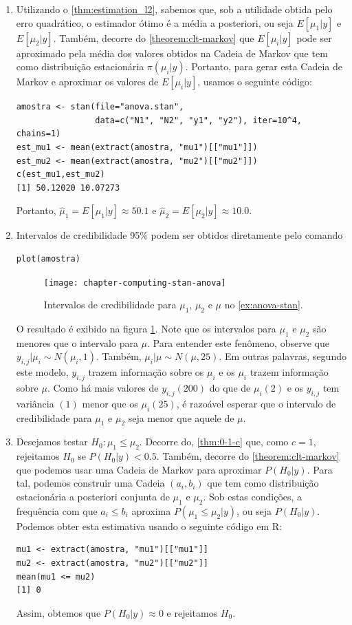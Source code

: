 {\begin{enumerate}[label=(\alph*)]
	\item Utilizando o \cref{thm:estimation_l2},
        sabemos que, sob a utilidade obtida pelo erro quadrático,
				o estimador ótimo é a média a posteriori, 
				ou seja $E[\mu_{1}|y]$ e $E[\mu_{2}|y]$.
				Também, decorre do \cref{theorem:clt-markov} que
				$E[\mu_{i}|y]$ pode ser aproximado pela média
				dos valores obtidos na Cadeia de Markov que
				tem como distribuição estacionária $\pi(\mu_{i}|y)$.
				Portanto, para gerar esta Cadeia de Markov e
				aproximar os valores de $E[\mu_{i}|y]$,
				usamos o seguinte código:
	\begin{verbatim}
amostra <- stan(file="anova.stan", 
                data=c("N1", "N2", "y1", "y2"), iter=10^4, chains=1)	
est_mu1 <- mean(extract(amostra, "mu1")[["mu1"]])
est_mu2 <- mean(extract(amostra, "mu2")[["mu2"]])
c(est_mu1,est_mu2)
[1] 50.12020 10.07273
	\end{verbatim}
  Portanto, $\hat{\mu}_{1} = E[\mu_{1}|y] \approx 50.1$ e 
	$\hat{\mu}_{2} = E[\mu_{2}|y] \approx 10.0$.
	\item Intervalos de credibilidade 95\% podem ser obtidos diretamente pelo comando
	\begin{verbatim}
plot(amostra)
	\end{verbatim}
  \begin{figure}
	 \centering
   \texttt{[image: chapter-computing-stan-anova]}
	 \caption{Intervalos de credibilidade para $\mu_1$, $\mu_2$ e $\mu$
	          no \cref{ex:anova-stan}.}
	 \label{fig:anova-stan}
	\end{figure}
	O resultado é exibido na figura \ref{fig:anova-stan}.
	Note que os intervalos para $\mu_{1}$ e $\mu_{2}$ são menores
	que o intervalo para $\mu$.
	Para entender este fenômeno, observe que $y_{i,j}|\mu_{i} \sim N(\mu_{i},1)$.
	Também, $\mu_{i}|\mu \sim N(\mu,25)$.
	Em outras palavras, segundo este modelo,
	$y_{i,j}$ trazem informação sobre os $\mu_{i}$ e
	os $\mu_{i}$ trazem informação sobre $\mu$.
	Como há mais valores de $y_{i,j} (200)$ do que de $\mu_{i} (2)$
	e os $y_{i,j}$ tem variância $(1)$ menor que os $\mu_{i} (25)$,
	é razoável esperar que o intervalo de credibilidade para $\mu_{1}$ e $\mu_{2}$
	seja menor que aquele de $\mu$.
	
	\item Desejamos testar $H_{0}: \mu_{1} \leq \mu_{2}$.
	      Decorre do, \cref{thm:0-1-c} que, como $c=1$,
				rejeitamos $H_{0}$ se $P(H_{0}|y) < 0.5$.
				Também, decorre do \cref{theorem:clt-markov} que
				podemos usar uma Cadeia de Markov para aproximar $P(H_{0}|y)$.
				Para tal, podemos construir uma Cadeia $(a_{i},b_{i})$ que 
				tem como distribuição estacionária a 
				posteriori conjunta de $\mu_{1}$ e $\mu_{2}$.
				Sob estas condições, a frequência com que $a_{i} \leq b_{i}$
				aproxima $P(\mu_{1} \leq \mu_{2}|y)$, ou seja $P(H_{0}|y)$.
				Podemos obter esta estimativa usando o seguinte código em R:
\begin{verbatim}
mu1 <- extract(amostra, "mu1")[["mu1"]]
mu2 <- extract(amostra, "mu2")[["mu2"]]
mean(mu1 <= mu2)
[1] 0
\end{verbatim}
	     Assim, obtemos que $P(H_{0}|y) \approx 0$ e rejeitamos $H_{0}$.
			

\end{enumerate}}
